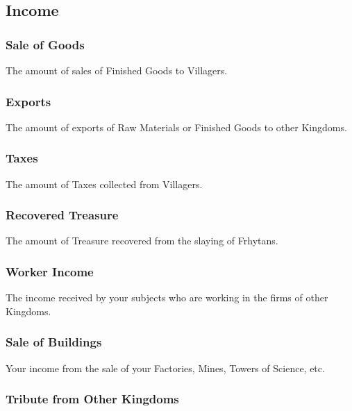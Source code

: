 {\subsection{\textsf{Income}}



\subsubsection{\textsf{Sale of Goods}}

The amount of sales of Finished Goods to Villagers.

\subsubsection{\textsf{Exports}}

The amount of exports of Raw Materials or Finished Goods to other Kingdoms.

\subsubsection{\textsf{Taxes}}

The amount of Taxes collected from Villagers.

\subsubsection{\textsf{Recovered Treasure}}

The amount of Treasure recovered from the slaying of Frhytans.

\subsubsection{\textsf{Worker Income}}

The income received by your subjects who are working in the firms of other Kingdoms.

\subsubsection{\textsf{Sale of Buildings}}

Your income from the sale of your Factories, Mines, Towers of Science, etc.

\subsubsection{\textsf{Tribute from Other Kingdoms}}

}
